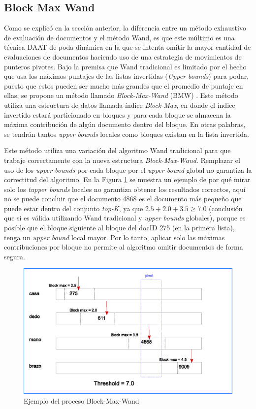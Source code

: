 \subsection{Block Max Wand}
\label{bmw}
Como se explicó en la sección anterior, la diferencia entre un método exhaustivo de evaluación de documentos y el método Wand, es que este múltimo es una técnica DAAT de poda dinámica \citep{Moffat:1996} en la que se intenta omitir la mayor cantidad de evaluaciones de documentos haciendo uso de una estrategia de movimientos de punteros pivotes.
Bajo la premisa que Wand tradicional es limitado por el hecho que usa los máximos puntajes de las listas invertidas (\textit{Upper bounds}) para podar, puesto que estos pueden ser mucho más grandes que el promedio de puntaje en ellas, se propone un método llamado \textit{Block-Max-Wand} (BMW) \citep{Ding:2011}. Este método utiliza una estructura de datos llamada índice \textit{Block-Max}, en donde el índice invertido estará particionado en bloques y para cada bloque se almacena la máxima contribución de algún documento dentro del bloque. En otras palabras, se tendrán tantos \textit{upper bounds} locales como bloques existan en la lista invertida.

Este método utiliza una variación del algoritmo Wand tradicional para que trabaje correctamente con la nueva estructura \textit{Block-Max-Wand}. Remplazar el uso de los \textit{upper bounds} por cada bloque por el \textit{upper bound} global no garantiza la correctitud del algoritmo. En la Figura \ref{fig:bmw} se muestra un ejemplo de por qué mirar solo los \textit{tupper bounds} locales no garantiza obtener los resultados correctos, aquí no se puede concluir que el documento 4868 es el documento más pequeño que puede estar dentro del conjunto \textit{top-K}, ya que $2.5 + 2.0 + 3.5 \geq 7.0$ (conclusión que sí es válida utilizando Wand tradicional y \textit{upper bounds} globales), porque es posible que el bloque siguiente al bloque del docID 275 (en la primera lista), tenga un \textit{upper bound} local mayor. Por lo tanto, aplicar solo las máximas contribuciones por bloque no permite al algoritmo omitir documentos de forma segura.  

\begin{figure}[!th]
\centering
\includegraphics[scale=.75]{images/block-max-wand.eps}
\caption{Ejemplo del proceso Block-Max-Wand}
\label{fig:bmw}
\end{figure}


